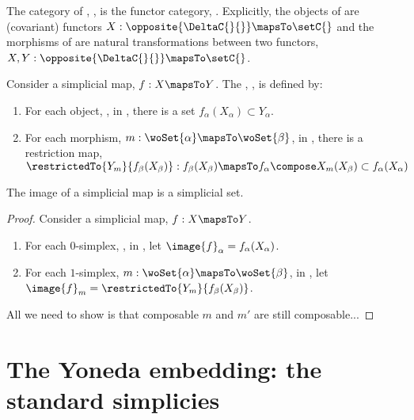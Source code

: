 \begin{definition}
The category of , \simpC{}, is the functor category, 
\funcCat{\opposite{\DeltaC{}{}}}{\setC{}}.  Explicitly, the objects of \simpC{} are 
(covariant) functors $X : \opposite{\DeltaC{}{}} \mapsTo \setC{}$ and the morphisms of 
\simpC{} are natural transformations between two functors, $X, Y : \opposite{\DeltaC{}{}} 
\mapsTo \setC{}$.
\end{definition}

\begin{definition}
Consider a simplicial map, $f : X \mapsTo Y$.  The , 
, is defined by:
\begin{enumerate}
\item For each object, \woSet{\alpha}, in \DeltaC{}{}, there is a set 
$f_{\alpha}(X_{\alpha}) \subset Y_{\alpha}$.
\item For each morphism, $m : \woSet{\alpha} \mapsTo \woSet{\beta}$, in \DeltaC{}{}, there 
is a restriction map, $\restrictedTo{Y_m}{f_{\beta}(X_{\beta})} : f_{\beta}(X_{\beta}) 
\mapsTo f_{\alpha}\compose X_m (X_{\beta}) \subset f_{\alpha}(X_{\alpha})$ 
\end{enumerate}
\end{definition}

\begin{lemma}
The image of a simplicial map is a simplicial set.
\end{lemma}
\begin{proof} Consider a simplicial map, $f : X \mapsTo Y$.
\begin{enumerate}
\item For each $0$-simplex, \woSet{\alpha}, in \DeltaC{}{}, let $\image{f}_{\alpha} = 
f_{\alpha}(X_{\alpha})$.
\item For each $1$-simplex, $m : \woSet{\alpha} \mapsTo \woSet{\beta}$, in \DeltaC{}{}, let 
$\image{f}_m = \restrictedTo{Y_m}{f_{\beta}(X_{\beta})}$.
\end{enumerate}
All we need to show is that composable $m$ and $m'$ are still composable... 
\end{proof}

\section{The Yoneda embedding: the standard simplicies}



